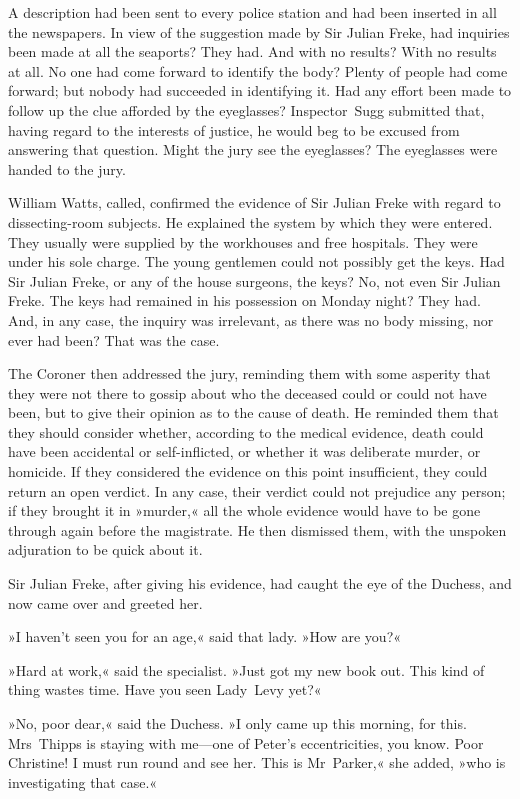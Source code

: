 A description had been sent to every police station and had been inserted in all the newspapers. In view of the suggestion made by Sir Julian Freke, had inquiries been made at all the seaports? They had. And with no results? With no results at all. No one had come forward to identify the body? Plenty of people had come forward; but nobody had succeeded in identifying it. Had any effort been made to follow up the clue afforded by the eyeglasses? Inspector~Sugg submitted that, having regard to the interests of justice, he would beg to be excused from answering that question. Might the jury see the eyeglasses? The eyeglasses were handed to the jury.

William Watts, called, confirmed the evidence of Sir Julian Freke with regard to dissecting-room subjects. He explained the system by which they were entered. They usually were supplied by the workhouses and free hospitals. They were under his sole charge. The young gentlemen could not possibly get the keys. Had Sir Julian Freke, or any of the house surgeons, the keys? No, not even Sir Julian Freke. The keys had remained in his possession on Monday night? They had. And, in any case, the inquiry was irrelevant, as there was no body missing, nor ever had been? That was the case.

The Coroner then addressed the jury, reminding them with some asperity that they were not there to gossip about who the deceased could or could not have been, but to give their opinion as to the cause of death. He reminded them that they should consider whether, according to the medical evidence, death could have been accidental or self-inflicted, or whether it was deliberate murder, or homicide. If they considered the evidence on this point insufficient, they could return an open verdict. In any case, their verdict could not prejudice any person; if they brought it in »murder,« all the whole evidence would have to be gone through again before the magistrate. He then dismissed them, with the unspoken adjuration to be quick about it.

Sir Julian Freke, after giving his evidence, had caught the eye of the Duchess, and now came over and greeted her.

»I haven't seen you for an age,« said that lady. »How are you?«

»Hard at work,« said the specialist. »Just got my new book out. This kind of thing wastes time. Have you seen Lady~Levy yet?«

»No, poor dear,« said the Duchess. »I only came up this morning, for this. Mrs~Thipps is staying with me—one of Peter's eccentricities, you know. Poor Christine! I must run round and see her. This is Mr~Parker,« she added, »who is investigating that case.«


